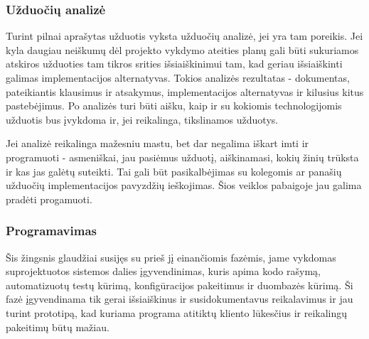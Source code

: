 \documentclass{VUMIFPSkursinis}
\begin{document}
	\subsubsection{Užduočių analizė}
	Turint pilnai aprašytas užduotis vyksta užduočių analizė, jei yra tam poreikis. Jei kyla daugiau neiškumų dėl projekto vykdymo ateities planų gali būti sukuriamos atskiros užduoties tam tikros srities išsiaiškinimui tam, kad geriau išsiaiškinti galimas implementacijos alternatyvas. Tokios analizės rezultatas - dokumentas, pateikiantis klausimus ir atsakymus, implementacijos alternatyvas ir kilusius kitus pastebėjimus. Po analizės turi būti aišku, kaip ir su kokiomis technologijomis užduotis bus įvykdoma ir, jei reikalinga, tikslinamos užduotys. 
	\par Jei analizė reikalinga mažesniu mastu, bet dar negalima iškart imti ir programuoti - asmeniškai, jau pasiėmus užduotį, aiškinamasi, kokių žinių trūksta ir kas jas galėtų suteikti. Tai gali būt pasikalbėjimas su kolegomis ar panašių užduočių implementacijos pavyzdžių ieškojimas. Šios veiklos pabaigoje jau galima pradėti progamuoti.
	\subsubsection{Programavimas}
	Šis žingsnis glaudžiai susijęs su prieš jį einančiomis fazėmis, jame vykdomas suprojektuotos sistemos dalies įgyvendinimas, kuris apima kodo rašymą, automatizuotų testų kūrimą, konfigūracijos pakeitimus ir duombazės kūrimą. Ši fazė įgyvendinama tik gerai išsiaiškinus ir susidokumentavus reikalavimus ir jau turint prototipą, kad kuriama programa atitiktų kliento lūkesčius ir reikalingų pakeitimų būtų mažiau.
\end{document}
